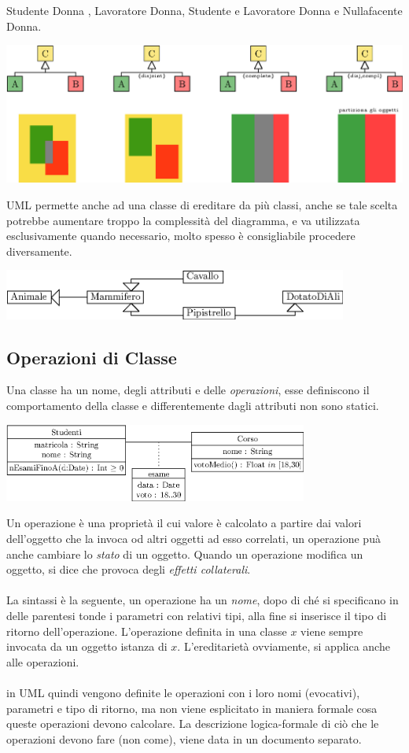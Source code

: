 \documentclass[12pt, letterpaper]{article}
\newcommand{\acc}{\\\hphantom{}\\}
\begin{document}
Studente Donna ,
Lavoratore Donna,
Studente e Lavoratore Donna e
Nullafacente Donna.\begin{center}
    \includegraphics[width=1\textwidth ]{images/criteriDisjointComplete.eps}
\end{center}
UML permette anche ad una classe di ereditare da più classi, anche se tale scelta potrebbe
aumentare troppo la complessità del diagramma, e va utilizzata esclusivamente quando necessario, molto spesso
è consigliabile procedere diversamente.\begin{center}
    \includegraphics[width=0.85\textwidth ]{images/eredMultipla.eps}
\end{center}
\subsection{Operazioni di Classe}
Una classe ha un nome, degli attributi e delle \textit{operazioni},
esse definiscono il comportamento della classe e differentemente dagli attributi
non sono statici.\begin{center}
    \includegraphics[width=0.75\textwidth ]{images/operazione.eps}
\end{center}
Un operazione è una proprietà il cui valore è calcolato a
partire dai valori dell'oggetto che la invoca od altri oggetti ad esso
correlati, un operazione puà anche cambiare lo \textit{stato} di un
oggetto. Quando un operazione modifica un oggetto, si dice che provoca degli
\textit{effetti collaterali}.\acc
La sintassi è la seguente, un operazione ha un \textit{nome}, dopo di ché
si specificano in delle parentesi tonde i parametri con relativi tipi, alla fine
si inserisce il tipo di ritorno dell'operazione. L'operazione definita in
una classe $x$ viene sempre invocata da un oggetto istanza di $x$. L'ereditarietà
ovviamente, si applica anche alle operazioni.\acc
in UML quindi vengono definite le operazioni con i loro nomi (evocativi), parametri e tipo di ritorno, ma non viene
esplicitato in maniera formale cosa queste operazioni devono calcolare. La descrizione logica-formale di ciò che
le operazioni devono fare (non come), viene data in un documento separato.
\end{document}
